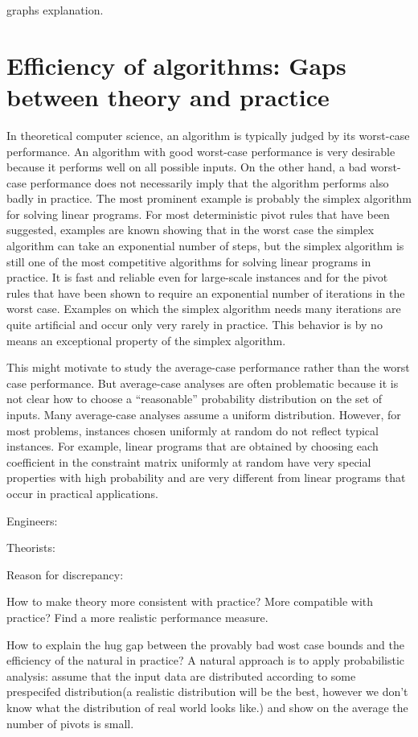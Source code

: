 \documentclass{article}
\begin{document}
graphs explanation.



\section{Efficiency of algorithms: Gaps between theory and practice}

In theoretical computer science, an algorithm is typically judged by its worst-case performance. An algorithm with good worst-case performance is very desirable because it performs
well on all possible inputs. On the other hand, a bad worst-case performance does not necessarily imply that the algorithm performs also badly in practice. The most prominent example
is probably the simplex algorithm for solving linear programs. For most deterministic pivot
rules that have been suggested, examples are known showing that in the worst case the
simplex algorithm can take an exponential number of steps, but the simplex algorithm is
still one of the most competitive algorithms for solving linear programs in practice. It is
fast and reliable even for large-scale instances and for the pivot rules that have been shown
to require an exponential number of iterations in the worst case. Examples on which the
simplex algorithm needs many iterations are quite artificial and occur only very rarely in
practice. This behavior is by no means an exceptional property of the simplex algorithm.


This might motivate to study the average-case performance rather than the worst case performance. But average-case analyses are often problematic because it is not clear how to
choose a “reasonable” probability distribution on the set of inputs. Many average-case analyses assume a uniform distribution. However, for most problems, instances chosen uniformly
at random do not reflect typical instances. For example, linear programs that are obtained
by choosing each coefficient in the constraint matrix uniformly at random have very special
properties with high probability and are very different from linear programs that occur in
practical applications. 

Engineers:

Theorists:

Reason for discrepancy:

How to make theory more consistent with practice? More compatible with practice? Find a more realistic performance measure.

How to explain the hug gap between the provably bad wost case bounds and the efficiency of the natural in practice? A natural approach is to apply probabilistic analysis: assume that the input data are distributed according to some prespecifed distribution(a realistic distribution will be the best, however we don't know what the distribution of real world looks like.) and show on the average the number of pivots is small.
\end{document}
